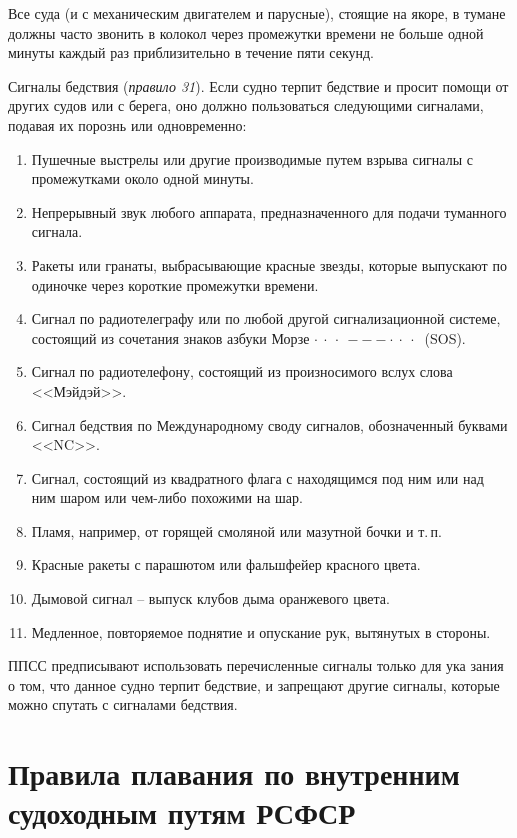 \documentclass[a4paper, 12pt, twoside, final]{scrbook}
\begin{document}
Все суда (и с механическим двигателем и парусные), стоящие на якоре, в тумане должны часто звонить в колокол через промежутки времени не больше одной минуты каждый раз приблизительно в течение пяти секунд.

Сигналы бедствия (\textit{правило 31}). Если судно терпит бедствие и просит помощи от других судов или с берега, оно должно пользоваться следующими сигналами, подавая их порознь или одновременно:

\begin{enumerate}
\item Пушечные выстрелы или другие производимые путем взрыва сигналы с промежутками около одной минуты.
\item Непрерывный звук любого аппарата, предназначенного для подачи туманного сигнала.
\item Ракеты или гранаты, выбрасывающие красные звезды, которые выпускают по одиночке через короткие промежутки времени.
\item Сигнал по радиотелеграфу или по любой другой сигнализационной системе, состоящий из сочетания знаков азбуки Морзе $\cdot\ \cdot\ \cdot\ - - - \cdot\ \cdot\ \cdot\ $ (SOS).
\item Сигнал по радиотелефону, состоящий из произносимого вслух слова <<Мэйдэй>>.
\item Сигнал бедствия по Международному своду сигналов, обозначенный буквами <<NC>>.
\item Сигнал, состоящий из квадратного флага с находящимся под ним или над ним шаром или чем-либо похожими на шар.
\item Пламя, например, от горящей смоляной или мазутной бочки и т.\,п.
\item Красные ракеты с парашютом или фальшфейер красного цвета.
\item Дымовой сигнал \--- выпуск клубов дыма оранжевого цвета.
\item Медленное, повторяемое поднятие и опускание рук, вытянутых в стороны.
\end{enumerate}

ППСС предписывают использовать перечисленные сигналы только для ука зания о том, что данное судно терпит бедствие, и запрещают другие сигналы, которые можно спутать с сигналами бедствия.

\section{Правила плавания по внутренним судоходным путям РСФСР}
\end{document}
